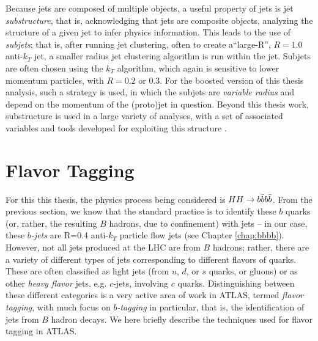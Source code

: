 Because jets are composed of multiple objects, a useful property of jets is jet \emph{substructure}, that is, 
acknowledging that jets are composite objects, analyzing the structure of a given jet to infer physics information. 
This leads to the use of \emph{subjets}; that is, after running jet clustering, often to create a``large-R'', $R=1.0$ 
anti-$k_{T}$ jet, a smaller radius jet clustering algorithm is run within the jet. Subjets are often chosen using the 
$k_{T}$ algorithm, which again is sensitive to lower momentum particles, with $R=0.2$ or 0.3. For the boosted version 
of this thesis analysis, such a strategy is used, in which the subjets are \emph{variable radius} and depend on the 
momentum of the (proto)jet in question. Beyond this thesis work, substructure is used in a large variety of analyses, 
with a set of associated variables and tools developed for exploiting this structure .
 
\section{Flavor Tagging}
For this this thesis, the physics process being considered is $HH\rightarrow b\bar{b}b\bar{b}$. From the previous section, we 
know that the standard practice is to identify these $b$ quarks (or, rather, the resulting $B$ hadrons, due to confinement) 
with jets -- in our case, these \emph{$b$-jets} are R=0.4 anti-$k_{T}$ particle flow jets (see Chapter \ref{chap:bbbb}). 
However, not all jets produced at the LHC are from $B$ hadrons; rather, there are a variety of different types of jets 
corresponding to different flavors of quarks. These are often classified as light jets (from $u$, $d$, or $s$ quarks, or 
gluons) or as other \emph{heavy flavor} jets, e.g. $c$-jets, involving $c$ quarks. Distinguishing between these different 
categories is a very active area of work in ATLAS, termed \emph{flavor tagging}, with much focus on \emph{$b$-tagging} in 
particular, that is, the identification of jets from $B$ hadron decays. We here briefly describe the techniques used 
for flavor tagging in ATLAS.

